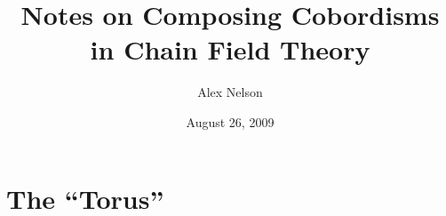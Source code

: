 \documentclass{amsart}
\title{Notes on Composing Cobordisms in Chain Field Theory}
\date{August 26, 2009}
\author{Alex Nelson}
\numberwithin{equation}{section}
\begin{document}
\maketitle
\section{The ``Torus''}




\nocite{*}


\end{document}
